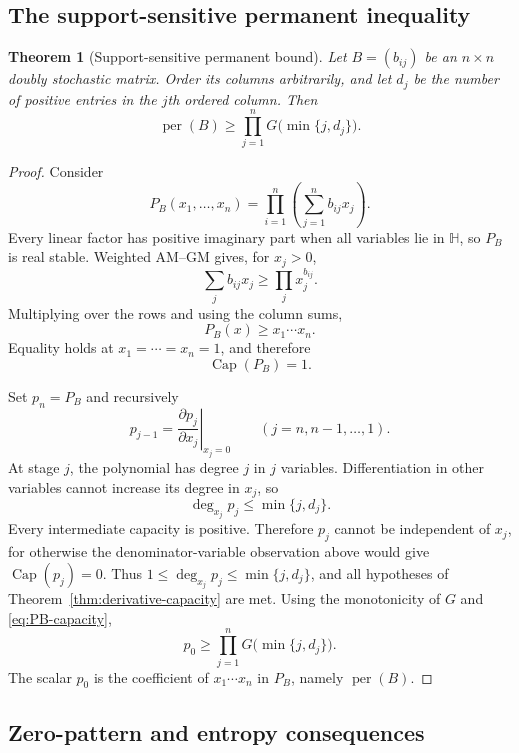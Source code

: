 \documentclass[11pt,a4paper]{article}
\numberwithin{equation}{section}
\newtheorem{theorem}{Theorem}[section]
\theoremstyle{definition}
\newcommand{\per}{\operatorname{per}}
\newcommand{\pcap}{\operatorname{Cap}}
\newcommand{\1}{\mathbf{1}}
\newcommand{\cH}{\mathbb{H}}
\begin{document}
\subsection{The support-sensitive permanent inequality}

\begin{theorem}[Support-sensitive permanent bound]\label{thm:support-bound}
Let $B=(b_{ij})$ be an $n\times n$ doubly stochastic matrix.  Order its columns arbitrarily, and let $d_j$ be the number of positive entries in the $j$th ordered column.  Then
\begin{equation}\label{eq:support-bound}
 \per(B)\ge
 \prod_{j=1}^nG\bigl(\min\{j,d_j\}\bigr).
\end{equation}
\end{theorem}

\begin{proof}
Consider
\[
 P_B(x_1,\dots,x_n)
 =\prod_{i=1}^n\left(\sum_{j=1}^n b_{ij}x_j\right).
\]
Every linear factor has positive imaginary part when all variables lie in $\cH$, so $P_B$ is real stable.  Weighted AM--GM gives, for $x_j>0$,
\[
 \sum_jb_{ij}x_j\ge\prod_jx_j^{b_{ij}}.
\]
Multiplying over the rows and using the column sums,
\[
 P_B(x)\ge x_1\cdots x_n.
\]
Equality holds at $x_1=\cdots=x_n=1$, and therefore
\begin{equation}\label{eq:PB-capacity}
 \pcap(P_B)=1.
\end{equation}

Set $p_n=P_B$ and recursively
\[
 p_{j-1}
 =\left.\frac{\partial p_j}{\partial x_j}\right|_{x_j=0}
 \qquad(j=n,n-1,\dots,1).
\]
At stage $j$, the polynomial has degree $j$ in $j$ variables.
Differentiation in other variables cannot increase its degree in $x_j$, so
\[
 \deg_{x_j}p_j\le\min\{j,d_j\}.
\]
Every intermediate capacity is positive.  Therefore $p_j$ cannot be
independent of $x_j$, for otherwise the denominator-variable observation
above would give $\pcap(p_j)=0$.  Thus
$1\le\deg_{x_j}p_j\le\min\{j,d_j\}$, and all hypotheses of
Theorem~\ref{thm:derivative-capacity} are met.  Using the monotonicity of
$G$ and \eqref{eq:PB-capacity},
\[
 p_0\ge\prod_{j=1}^nG\bigl(\min\{j,d_j\}\bigr).
\]
The scalar $p_0$ is the coefficient of $x_1\cdots x_n$ in $P_B$, namely $\per(B)$.
\end{proof}

\subsection{Zero-pattern and entropy consequences}
\end{document}
